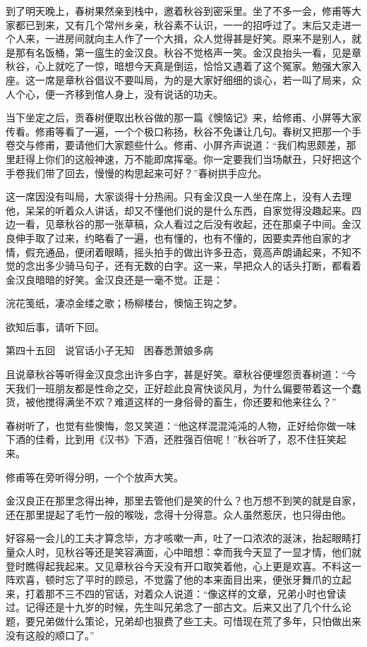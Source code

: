 \documentclass[12pt,UTF8]{ctexbook}
\begin{document}
{{{到了明天晚上，春树果然亲到栈中，邀着秋谷到密采里。坐了不多一会，修甫等大家都已到来，又有几个常州乡亲，秋谷素不认识，一一的招呼过了。末后又走进一个人来，一进房间就向主人作了一个大揖，众人觉得甚是好笑。原来不是别人，就是那有名饭桶，第一瘟生的金汉良。秋谷不觉格声一笑。金汉良抬头一看，见是章秋谷，心上就吃了一惊，暗想今天真是倒运，恰恰又遇着了这个冤家。勉强大家入座。这一席是章秋谷倡议不要叫局，为的是大家好细细的谈心，若一叫了局来，众人个心，便一齐移到倌人身上，没有说话的功夫。

当下坐定之后，贡春树便取出秋谷做的那一篇《懊恼记》来，给修甫、小屏等大家传看。修甫等看了一遍，一个个极口称扬，秋谷不免谦让几句。春树又把那一个手卷交与修甫，要请他们大家题些什么。修甫、小屏齐声说道：“我们构思颇差，那里赶得上你们的这般神速，万不能即席挥毫。你一定要我们当场献丑，只好把这个手卷我们带了回去，慢慢的构思起来可好？”春树拱手应允。

这一席因没有叫局，大家谈得十分热闹。只有金汉良一人坐在席上，没有人去理他，呆呆的听着众人讲话，却又不懂他们说的是什么东西，自家觉得没趣起来。四边一看，见章秋谷的那一张草稿，众人看过之后没有收起，还在那桌子中间。金汉良伸手取了过来，约略看了一遍，也有懂的，也有不懂的，因要卖弄他自家的才情，假充通品，便闭着眼睛，摇头拍手的做出许多丑态，竟高声朗诵起来，不知不觉的念出多少骑马句子，还有无数的白字。这一来，早把众人的话头打断，都看着金汉良暗暗的好笑。金汉良还是一毫不觉。正是：

浣花笺纸，凄凉金缕之歌；杨柳楼台，懊恼王钩之梦。

欲知后事，请听下回。





第四十五回　说官话小子无知　困春悉萧娘多病





且说章秋谷等听得金汉良念出许多白字，甚是好笑。章秋谷便埋怨贡春树道：“今天我们一班朋友都是性命之交，正好趁此良宵快谈风月，为什么偏要带着这一个蠢货，被他搅得满坐不欢？难道这样的一身俗骨的畜生，你还要和他来往么？”

春树听了，也觉有些懊悔，忽又笑道：“他这样混混沌沌的人物，正好给你做一味下酒的佳肴，比到用《汉书》下酒，还胜强百倍呢！”秋谷听了，忍不住狂笑起来。

修甫等在旁听得分明，一个个放声大笑。

金汉良正在那里念得出神，那里去管他们是笑的什么？也万想不到笑的就是自家，还在那里提起了毛竹一般的喉咙，念得十分得意。众人虽然惹厌，也只得由他。

好容易一会儿的工夫才算念毕，方才咳嗽一声，吐了一口浓浓的涎沫，抬起眼睛打量众人时，见秋谷等还是笑容满面，心中暗想：幸而我今天显了一显才情，他们就登时瞧得起我起来。又见章秋谷今天没有开口取笑着他，心上更是欢喜。不料这一阵欢喜，顿时忘了平时的顾忌，不觉露了他的本来面目出来，便张牙舞爪的立起来，打着那不三不四的官话，对着众人说道：“像这样的文章，兄弟小时也曾读过。记得还是十九岁的时候，先生叫兄弟念了一部古文。后来又出了几个什么论题，要兄弟做什么策论，兄弟却也狠费了些工夫。可惜现在荒了多年，只怕做出来没有这般的顺口了。”

}}}
\end{document}
